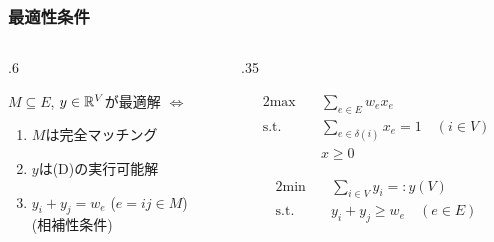 \documentclass[14pt,aspectratio=169,xcolor=dvipsnames,table,onlytextwidth,dvipdfmx]{beamer}
\begin{document}
\begin{frame}
    \frametitle{最適性条件}

    \begin{columns}[T]
    \begin{column}{.6\textwidth}
        \begin{lemma}[最適性条件]
        $M \subseteq E$, $y \in \mathbb{R}^V$が最適解 
        $\iff$
        \begin{enumerate}
            \item $M$は完全マッチング
            \item $y$は(D)の実行可能解
            \item $y_i + y_j = w_e$ \quad ($e = ij \in M$) \\ \hfill \alert{(相補性条件)}
        \end{enumerate}
        \end{lemma}
        
    \end{column}
    \begin{column}{.35\textwidth}
        \footnotesize
        \begin{primal}
        \begin{alignat*}{2}
            \text{max} & \quad  \sum_{e \in E} w_e x_e \\
            \text{s.t.} & \quad \sum_{e \in \delta(i)} x_e = 1  \quad (i \in V) \\
            & \quad x \geq 0 
        \end{alignat*}
    \end{primal}
    \begin{dual}
        \setlength{\abovedisplayskip}{0pt}
        \begin{alignat*}{2}
            \text{min} & \quad  \sum_{i \in V} y_i =: y(V) \\
            \text{s.t.} & \quad y_i + y_j \geq w_e \quad (e \in E) 
        \end{alignat*}
    \end{dual}
    \end{column}
    \end{columns}

\end{frame}
\end{document}
